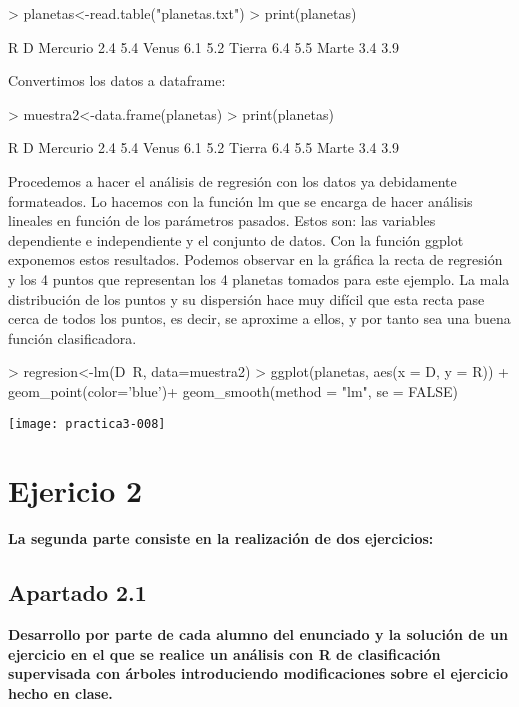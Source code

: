 \documentclass[a4paper]{article}
\begin{document}
\begin{Schunk}
\begin{Sinput}
> planetas<-read.table("planetas.txt")
> print(planetas)
\end{Sinput}
\begin{Soutput}
           R   D
Mercurio 2.4 5.4
Venus    6.1 5.2
Tierra   6.4 5.5
Marte    3.4 3.9
\end{Soutput}
\end{Schunk}

Convertimos los datos a dataframe:
\begin{Schunk}
\begin{Sinput}
> muestra2<-data.frame(planetas)
> print(planetas)
\end{Sinput}
\begin{Soutput}
           R   D
Mercurio 2.4 5.4
Venus    6.1 5.2
Tierra   6.4 5.5
Marte    3.4 3.9
\end{Soutput}
\end{Schunk}

Procedemos a hacer el análisis de regresión con los datos ya debidamente formateados. Lo hacemos con la función lm que se encarga de hacer análisis lineales en función de los parámetros pasados. 
Estos son: las variables dependiente e independiente y el conjunto de datos.
Con la función ggplot exponemos estos resultados. Podemos observar en la gráfica la recta de regresión y los 4 puntos que representan los 4 planetas tomados para este ejemplo. La mala distribución de los puntos y su dispersión hace muy difícil que esta recta pase cerca de todos los puntos, es decir, se aproxime a ellos, y por tanto sea una buena función clasificadora.
\begin{Schunk}
\begin{Sinput}
> regresion<-lm(D~R, data=muestra2)
> ggplot(planetas, aes(x = D, y = R)) + geom_point(color='blue')+ geom_smooth(method = "lm", se = FALSE)
\end{Sinput}
\end{Schunk}
\texttt{[image: practica3-008]}

\section{Ejericio 2}
\textbf{La segunda parte consiste en la realización de dos ejercicios:}
\subsection{Apartado 2.1}
\textbf{Desarrollo por parte de cada alumno del enunciado y la solución de un ejercicio en el que se realice un análisis con R de clasificación supervisada con árboles introduciendo modificaciones sobre el ejercicio hecho en clase.}
\end{document}
